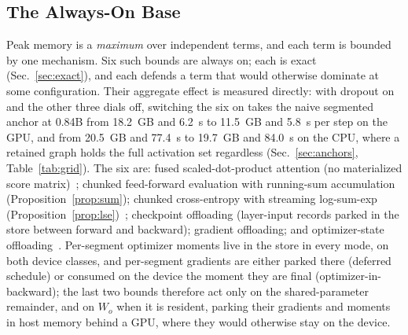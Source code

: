 \documentclass[journal]{IEEEtran}
\begin{document}
\subsection{The Always-On Base}\label{sec:base}
Peak memory is a \emph{maximum} over independent terms, and each term is
bounded by one mechanism. Six such bounds are always on; each is exact
(Sec.~\ref{sec:exact}), and each defends a term that would otherwise
dominate at some configuration. Their aggregate effect is measured
directly: with dropout on and the other three dials off, switching the six
on takes the naive segmented anchor at 0.84B from 18.2~GB and 6.2~s to
11.5~GB and 5.8~s per step on the GPU, and from 20.5~GB and 77.4~s to
19.7~GB and 84.0~s on the CPU, where a retained graph holds the full
activation set regardless (Sec.~\ref{sec:anchors}, Table~\ref{tab:grid}).
The six
are: fused scaled-dot-product attention (no
materialized score matrix)~\cite{rabe2021selfattention,dao2022flashattention};
chunked feed-forward evaluation with running-sum accumulation
(Proposition~\ref{prop:sum}); chunked cross-entropy with streaming
log-sum-exp (Proposition~\ref{prop:lse})~\cite{wijmans2025cce}; checkpoint
offloading (layer-input records parked in the store between forward and
backward); gradient offloading; and optimizer-state
offloading~\cite{ren2021zerooffload}. Per-segment optimizer moments live in
the store in every mode, on both device classes, and per-segment gradients
are either parked there (deferred schedule) or consumed on the device the
moment they are final (optimizer-in-backward); the last two bounds
therefore act only on the shared-parameter remainder, and on $W_o$ when it
is resident, parking their gradients and moments in host memory behind a
GPU, where they would otherwise stay on the device.
\end{document}

